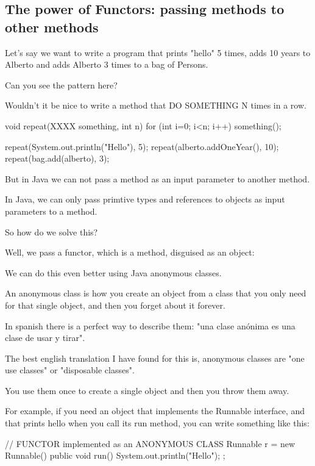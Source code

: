 \documentclass[a4paper, 9pt]{extarticle}
\begin{document}
\subsection{The power of Functors: passing methods to other methods}

Let's say we want to write a program that prints "hello" 5 times, adds 10 years
to Alberto and adds Alberto 3 times to a bag of Persons.


Can you see the pattern here?

Wouldn't it be nice to write a method that DO SOMETHING N times in a row.

\begin{blackboard}
void repeat(XXXX something, int n) {
  for (int i=0; i<n; i++) {
    something();
  }
}

repeat(System.out.println("Hello"), 5);
repeat(alberto.addOneYear(), 10);
repeat(bag.add(alberto), 3);
\end{blackboard}

But in Java we can not pass a method as an input parameter to another method.

In Java, we can only pass primtive types and references to objects as input
parameters to a method.

So how do we solve this?

Well, we pass a functor, which is a method, disguised as an object:


We can do this even better using Java anonymous classes.

An anonymous class is how you create an object from a class that you only need
for that single object, and then you forget about it forever.

In spanish there is a perfect way to describe them: "una clase anónima es una
clase de usar y tirar".

The best english translation I have found for this is, anonymous classes are
"one use classes" or "disposable classes".

You use them once to create a single object and then you throw them away.

For example, if you need an object that implements the Runnable interface, and
that prints hello when you call its run method, you can write something like this:

\begin{blackboard}
// FUNCTOR implemented as an ANONYMOUS CLASS
Runnable r = new Runnable() {
  public void run() {
    System.out.println("Hello");
  }
};
\end{blackboard}
\end{document}
